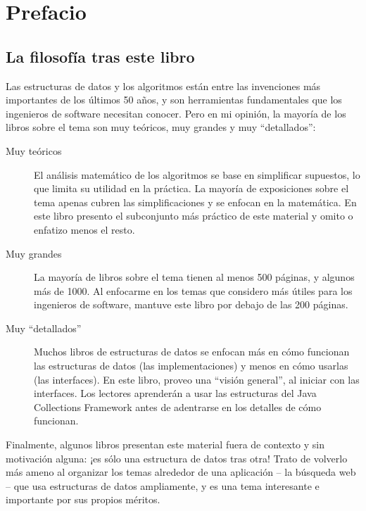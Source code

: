 \documentclass[12pt]{book}
\theoremstyle{exercise}
\begin{document}

\fi


\chapter*{Prefacio}
\label{preface}



\section*{La filosofía tras este libro}

Las estructuras de datos y los algoritmos están entre las invenciones más importantes
de los últimos 50 años, y son herramientas fundamentales que los ingenieros de
software necesitan conocer. Pero en mi opinión, la mayoría de los libros sobre
el tema son muy teóricos, muy grandes y muy ``detallados'':

\begin{description}

\item[Muy teóricos]  El análisis matemático de los algoritmos se base en
simplificar supuestos, lo que limita su utilidad en la práctica.
La mayoría de exposiciones sobre el tema apenas cubren las simplificaciones y
se enfocan en la matemática. En este libro presento el subconjunto más práctico
de este material y omito o enfatizo menos el resto.

\item[Muy grandes] La mayoría de libros sobre el tema tienen al menos 500 páginas,
y algunos más de 1000. Al enfocarme en los temas que considero más útiles
para los ingenieros de software, mantuve este libro por debajo de las 200 páginas.

\item[Muy ``detallados''] Muchos libros de estructuras de datos se enfocan más 
en cómo funcionan las estructuras de datos (las implementaciones) y menos
en cómo usarlas (las interfaces). En este libro, proveo una ``visión general'',
al iniciar con las interfaces. Los lectores aprenderán a usar las estructuras del
Java Collections Framework antes de adentrarse en los detalles de cómo funcionan.

\end{description}

Finalmente, algunos libros presentan este material fuera de contexto y sin
motivación alguna: ¡es sólo una estructura de datos tras otra!
Trato de volverlo más ameno al organizar los temas alrededor de una
aplicación -- la búsqueda web -- que usa estructuras de datos
ampliamente, y es una tema interesante e importante por sus propios méritos.
\end{document}
